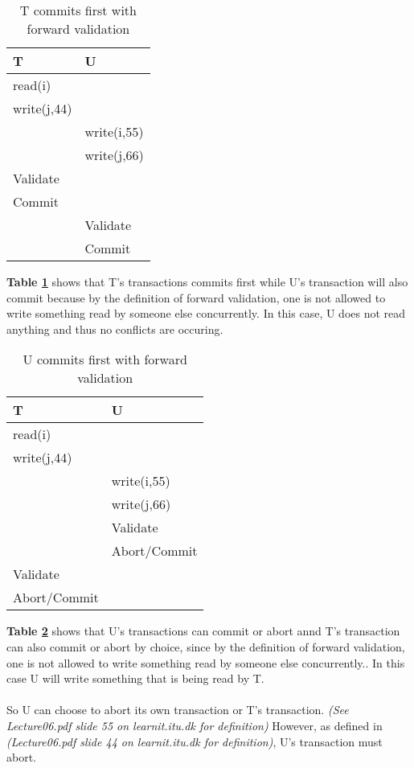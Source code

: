 \begin{table}[H]
	\centering
	\caption{T commits first with forward validation}
	\label{TFirstFor}
	\begin{tabular}{|l|l|}
		\hline
		T           & U           \\ \hline
		read(i)     &             \\ \hline
		write(j,44) &             \\ \hline
		& write(i,55) \\ \hline
		& write(j,66) \\ \hline
		Validate    &             \\ \hline
		Commit      &             \\ \hline
		& Validate    \\ \hline
		& Commit      \\ \hline
	\end{tabular}
\end{table}
\textbf{Table \ref{TFirstFor}} shows that T's transactions commits first while U's transaction will also commit because by the definition of forward validation, one is not allowed to write something read by someone else concurrently. In this case, U does not read anything and thus no conflicts are occuring.


\begin{table}[H]
	\centering
	\caption{U commits first with forward validation}
	\label{UFirstFor}
	\begin{tabular}{|l|l|}
		\hline
		T            & U            \\ \hline
		read(i)      &              \\ \hline
		write(j,44)  &              \\ \hline
		& write(i,55)  \\ \hline
		& write(j,66)  \\ \hline
		& Validate     \\ \hline
		& Abort/Commit \\ \hline
		Validate     &              \\ \hline
		Abort/Commit &              \\ \hline
	\end{tabular}
\end{table}

\textbf{Table \ref{UFirstFor}} shows that U's transactions can commit or abort annd T's transaction can also commit or abort by choice, since by the definition of forward validation, one is not allowed to write something read by someone else concurrently.. In this case U will write something that is being read by T.\\\\So U can choose to abort its own transaction or T's transaction. \textit{(See Lecture06.pdf slide 55 on learnit.itu.dk for definition)}
However, as defined in \textit{(Lecture06.pdf slide 44 on learnit.itu.dk for definition)}, U's transaction must abort.


